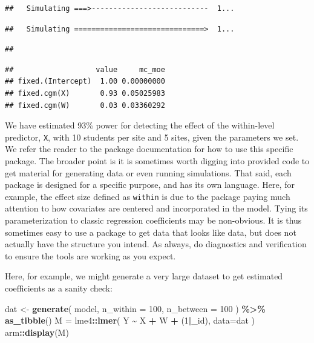 \documentclass[
]{book}
\newenvironment{Shaded}{\begin{snugshade}}{\end{snugshade}}
\newcommand{\AttributeTok}[1]{\textcolor[rgb]{0.13,0.29,0.53}{#1}}
\newcommand{\DecValTok}[1]{\textcolor[rgb]{0.00,0.00,0.81}{#1}}
\newcommand{\FunctionTok}[1]{\textcolor[rgb]{0.13,0.29,0.53}{\textbf{#1}}}
\newcommand{\NormalTok}[1]{#1}
\newcommand{\OtherTok}[1]{\textcolor[rgb]{0.56,0.35,0.01}{#1}}
\newcommand{\SpecialCharTok}[1]{\textcolor[rgb]{0.81,0.36,0.00}{\textbf{#1}}}
\newcommand{\StringTok}[1]{\textcolor[rgb]{0.31,0.60,0.02}{#1}}
\begin{document}
\begin{verbatim}
##   Simulating ===>---------------------------  1...
\end{verbatim}

\begin{verbatim}
##   Simulating ==============================>  1...
\end{verbatim}

\begin{verbatim}
## 
\end{verbatim}

\begin{verbatim}
##                   value     mc_moe
## fixed.(Intercept)  1.00 0.00000000
## fixed.cgm(X)       0.93 0.05025983
## fixed.cgm(W)       0.03 0.03360292
\end{verbatim}

We have estimated 93\% power for detecting the effect of the within-level predictor, \texttt{X}, with 10 students per site and 5 sites, given the parameters we set.
We refer the reader to the package documentation for how to use this specific package.
The broader point is it is sometimes worth digging into provided code to get material for generating data or even running simulations.
That said, each package is designed for a specific purpose, and has its own language.
Here, for example, the effect size defined as \texttt{within} is due to the package paying much attention to how covariates are centered and incorporated in the model.
Tying its parameterization to classic regression coefficients may be non-obvious.
It is thus sometimes easy to use a package to get data that looks like data, but does not actually have the structure you intend.
As always, do diagnostics and verification to ensure the tools are working as you expect.

Here, for example, we might generate a very large dataset to get estimated coefficients as a sanity check:

\begin{Shaded}
\begin{Highlighting}[]
\NormalTok{dat }\OtherTok{\textless{}{-}} \FunctionTok{generate}\NormalTok{( model, }
                 \AttributeTok{n\_within =} \DecValTok{100}\NormalTok{, }
                 \AttributeTok{n\_between =} \DecValTok{100}\NormalTok{ ) }\SpecialCharTok{\%\textgreater{}\%}
  \FunctionTok{as\_tibble}\NormalTok{()}
\NormalTok{M }\OtherTok{=}\NormalTok{ lme4}\SpecialCharTok{::}\FunctionTok{lmer}\NormalTok{( Y }\SpecialCharTok{\textasciitilde{}}\NormalTok{ X }\SpecialCharTok{+}\NormalTok{ W }\SpecialCharTok{+}\NormalTok{ (}\DecValTok{1}\SpecialCharTok{|}\StringTok{\textasciigrave{}}\AttributeTok{\_id}\StringTok{\textasciigrave{}}\NormalTok{), }\AttributeTok{data=}\NormalTok{dat )}
\NormalTok{arm}\SpecialCharTok{::}\FunctionTok{display}\NormalTok{(M)}
\end{Highlighting}
\end{Shaded}
\end{document}
